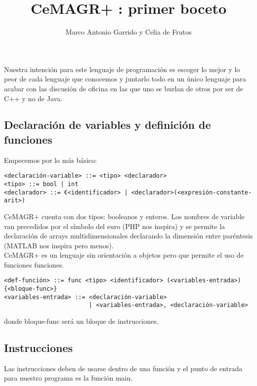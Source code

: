 \documentclass[spanish, a4paper, 12pt] {article}
\newcommand{\lname}[0]{CeMAGR+ }
\begin{document}
\title{\lname: primer boceto}
\author{Marco Antonio Garrido y Celia de Frutos}
\date{}
\maketitle
Nuestra intención para este lenguaje de programación es escoger lo mejor y lo peor de cada lenguaje que conocemos y juntarlo todo en un único lenguaje para acabar con las discusión de oficina en las que uno se burlan de otros por ser de C++ y no de Java.
\subsection*{Declaración de variables y definición de funciones}
Empecemos por lo más básico:
\begin{verbatim}
<declaración-variable> ::= <tipo> <declarador>
<tipo> ::= bool | int
<declarador> ::= €<identificador> | <declarador>(<expresión-constante-arit>)
\end{verbatim}
\lname cuenta con dos tipos: booleanos y enteros. Los nombres de variable van precedidos por el símbolo del euro (PHP nos inspira) y se permite la declaración de arrays multidimensionales declarando la dimensión entre paréntesis (MATLAB nos inspira pero menos).\\

\lname es un lenguaje sin orientación a objetos pero que permite el uso de funciones funciones.
\begin{verbatim}
<def-función> ::= func <tipo> <identificador> (<variables-entrada>) {<bloque-func>}
<variables-entrada> ::= <declaración-variable>
                        | <variables-entrada>, <declaración-variable>
\end{verbatim}
donde bloque-func será un bloque de instrucciones.
\subsection*{Instrucciones}
Las instrucciones deben de usarse dentro de una función y el punto de entrada para nuestro programa es la función main.\\
\end{document}

